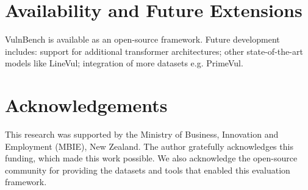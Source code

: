 \documentclass[letterpaper]{article}
\begin{document}
\section{Availability and Future Extensions}

VulnBench is available as an open-source framework. Future development includes: support for additional transformer architectures; other state-of-the-art models like LineVul\citep{linevul2022}; integration of more datasets e.g. PrimeVul\citep{ding2025vulnerability}.

\section*{Acknowledgements}
This research was supported by the Ministry of Business, Innovation and Employment (MBIE), New Zealand. The author gratefully acknowledges this funding, which made this work possible.
 We also acknowledge the open-source community for providing the datasets and tools that enabled this evaluation framework.



\end{document}
